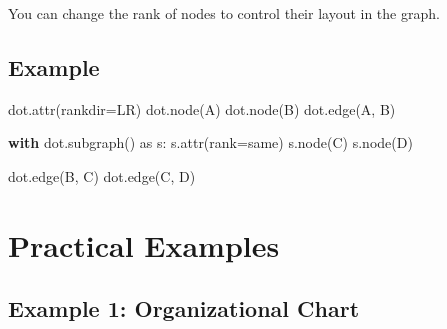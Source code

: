 \documentclass[
  letterpaper,
  DIV=11,
  numbers=noendperiod]{scrreprt}
\newenvironment{Shaded}{\begin{snugshade}}{\end{snugshade}}
\newcommand{\ControlFlowTok}[1]{\textcolor[rgb]{0.00,0.23,0.31}{\textbf{#1}}}
\newcommand{\ImportTok}[1]{\textcolor[rgb]{0.00,0.46,0.62}{#1}}
\newcommand{\NormalTok}[1]{\textcolor[rgb]{0.00,0.23,0.31}{#1}}
\newcommand{\OperatorTok}[1]{\textcolor[rgb]{0.37,0.37,0.37}{#1}}
\newcommand{\StringTok}[1]{\textcolor[rgb]{0.13,0.47,0.30}{#1}}
\begin{document}
You can change the rank of nodes to control their layout in the graph.

\subsection{Example}\label{example-50}

\begin{Shaded}
\begin{Highlighting}[]
\NormalTok{dot.attr(rankdir}\OperatorTok{=}\StringTok{\textquotesingle{}LR\textquotesingle{}}\NormalTok{)}
\NormalTok{dot.node(}\StringTok{\textquotesingle{}A\textquotesingle{}}\NormalTok{)}
\NormalTok{dot.node(}\StringTok{\textquotesingle{}B\textquotesingle{}}\NormalTok{)}
\NormalTok{dot.edge(}\StringTok{\textquotesingle{}A\textquotesingle{}}\NormalTok{, }\StringTok{\textquotesingle{}B\textquotesingle{}}\NormalTok{)}

\ControlFlowTok{with}\NormalTok{ dot.subgraph() }\ImportTok{as}\NormalTok{ s:}
\NormalTok{    s.attr(rank}\OperatorTok{=}\StringTok{\textquotesingle{}same\textquotesingle{}}\NormalTok{)}
\NormalTok{    s.node(}\StringTok{\textquotesingle{}C\textquotesingle{}}\NormalTok{)}
\NormalTok{    s.node(}\StringTok{\textquotesingle{}D\textquotesingle{}}\NormalTok{)}

\NormalTok{dot.edge(}\StringTok{\textquotesingle{}B\textquotesingle{}}\NormalTok{, }\StringTok{\textquotesingle{}C\textquotesingle{}}\NormalTok{)}
\NormalTok{dot.edge(}\StringTok{\textquotesingle{}C\textquotesingle{}}\NormalTok{, }\StringTok{\textquotesingle{}D\textquotesingle{}}\NormalTok{)}
\end{Highlighting}
\end{Shaded}

\section{Practical Examples}\label{practical-examples-8}

\subsection{Example 1: Organizational
Chart}\label{example-1-organizational-chart}
\end{document}
